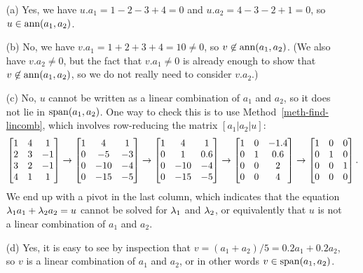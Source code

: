 \documentclass[a4paper]{amsart}
\renewenvironment{solution}{\SolutionInline}{\endSolutionInline}
\begin{document}
\begin{solution}
 \begin{itemize}
  \item[(a)] Yes, we have $u.a_1=1-2-3+4=0$ and $u.a_2=4-3-2+1=0$, so
   $u\in\operatorname{ann}(a_1,a_2)$.
  \item[(b)] No, we have $v.a_1=1+2+3+4=10\neq 0$, so
   $v\not\in\operatorname{ann}(a_1,a_2)$.  (We also have $v.a_2\neq 0$, but the fact
   that $v.a_1\neq 0$ is already enough to show that
   $v\not\in\operatorname{ann}(a_1,a_2)$, so we do not really need to consider
   $v.a_2$.)
  \item[(c)] No, $u$ cannot be written as a linear combination of
   $a_1$ and $a_2$, so it does not lie in $\operatorname{span}(a_1,a_2)$.  One way to
   check this is to use Method~\ref{meth-find-lincomb}, which involves
   row-reducing the matrix $[a_1|a_2|u]$:
   \[ 
     \left[\begin{matrix} 1 & 4 & 1 \\
          2 & 3 & -1 \\
          3 & 2 & -1 \\
          4 & 1 &  1 \end{matrix}\right] 
     \to
     \left[\begin{matrix} 1 &   4 &  1 \\
          0 &  -5 & -3 \\
          0 & -10 & -4 \\
          0 & -15 & -5 \end{matrix}\right] 
     \to
     \left[\begin{matrix} 1 &   4 &  1 \\
          0 &   1 & 0.6 \\
          0 & -10 & -4 \\
          0 & -15 & -5 \end{matrix}\right] 
     \to
     \left[\begin{matrix} 1 &   0 & -1.4 \\
          0 &   1 &  0.6 \\
          0 &   0 &  2 \\
          0 &   0 &  4 \end{matrix}\right] 
     \to
     \left[\begin{matrix} 1 &   0 &  0 \\
          0 &   1 &  0 \\
          0 &   0 &  1 \\
          0 &   0 &  0 \end{matrix}\right]. 
   \]
   We end up with a pivot in the last column, which indicates that the
   equation $\lambda_1a_1+\lambda_2a_2=u$ cannot be solved for $\lambda_1$ and
   $\lambda_2$, or equivalently that $u$ is not a linear combination of
   $a_1$ and $a_2$.
  \item[(d)] Yes, it is easy to see by inspection that
   $v=(a_1+a_2)/5=0.2a_1+0.2a_2$, so $v$ is a linear combination of
   $a_1$ and $a_2$, or in other words $v\in\operatorname{span}(a_1,a_2)$.
 \end{itemize}
\end{solution}
\end{document}
